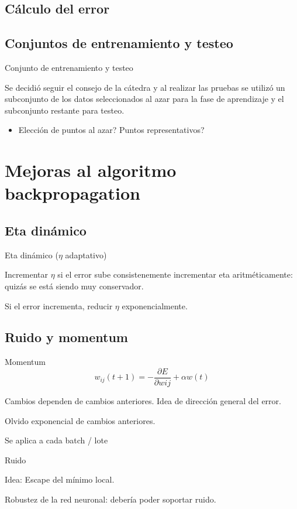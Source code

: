 \documentclass{beamer}
\begin{document}
\subsection{Cálculo del error}

\subsection{Conjuntos de entrenamiento y testeo}
\begin{frame}{Conjunto de entrenamiento y testeo}
\par Se decidió seguir el consejo de la cátedra y al realizar las pruebas se utilizó un subconjunto de los datos seleccionados al azar para la fase de aprendizaje y el subconjunto restante para testeo.

\begin{itemize}
\item Elección de puntos al azar? Puntos representativos?
\end{itemize}
\end{frame}

\section{Mejoras al algoritmo backpropagation}

\subsection{Eta dinámico}
\begin{frame}{Eta dinámico ($\eta$ adaptativo)}
\par Incrementar $\eta$ si el error sube consistenemente incrementar eta aritméticamente: quizás se está siendo muy conservador.
\par Si el error incrementa, reducir $\eta$ exponencialmente.
\end{frame}

\subsection{Ruido y momentum}
\begin{frame}{Momentum}
\[w_{ij}(t+1)= - \frac{\partial E}{\partial w{ij}} + \alpha w(t)\]
\par Cambios dependen de cambios anteriores. Idea de dirección general del error. 
\par Olvido exponencial de cambios anteriores.
\par Se aplica a cada batch / lote
\end{frame}
\begin{frame}{Ruido}
\par Idea: Escape del mínimo local.
\par Robustez de la red neuronal: debería poder soportar ruido.
\end{frame}
\end{document}
